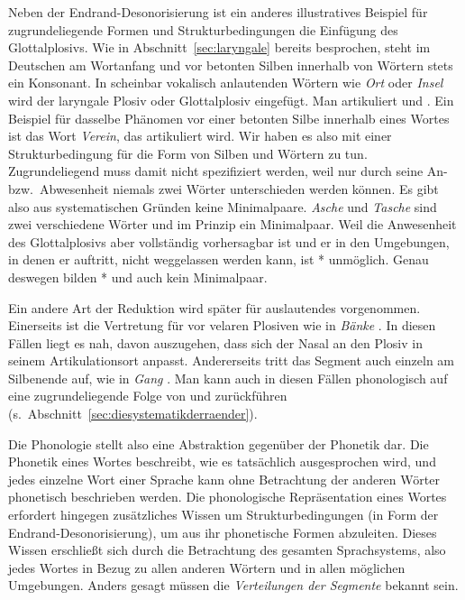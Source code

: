 Neben der Endrand-Desonorisierung ist ein anderes illustratives Beispiel für zugrundeliegende Formen und Strukturbedingungen die Einfügung des Glottalplosivs.
Wie in Abschnitt~\ref{sec:laryngale} bereits besprochen, steht im Deutschen am Wortanfang und vor betonten Silben innerhalb von Wörtern stets ein Konsonant.
In scheinbar vokalisch anlautenden Wörtern wie \textit{Ort} oder \textit{Insel} wird der laryngale Plosiv oder Glottalplosiv \textipa{[P]} eingefügt.
Man artikuliert \textipa{[P\t{O@}t]} und \textipa{[PInz@l]}.
Ein Beispiel für dasselbe Phänomen vor einer betonten Silbe innerhalb eines Wortes ist das Wort \textit{Verein}, das \textipa{[f5P\t{aE}n]} artikuliert wird.
Wir haben es also mit einer Strukturbedingung für die Form von Silben und Wörtern zu tun.
Zugrundeliegend muss \textipa{[P]} damit nicht spezifiziert werden, weil nur durch seine An- bzw.\ Abwesenheit niemals zwei Wörter unterschieden werden können.
Es gibt also aus systematischen Gründen keine Minimalpaare.
\textit{Asche} \textipa{[PaS@]} und \textit{Tasche} \textipa{[taS@]} sind zwei verschiedene Wörter und im Prinzip ein Minimalpaar.
Weil die Anwesenheit des Glottalplosivs aber vollständig vorhersagbar ist und er in den Umgebungen, in denen er auftritt, nicht weggelassen werden kann, ist *\textipa{[aS@]} unmöglich.
Genau deswegen bilden *\textipa{[aS@]} und \textipa{[PaS@]} auch kein Minimalpaar.

Ein andere Art der Reduktion wird später für auslautendes \textipa{[N]} vorgenommen.
Einerseits ist \textipa{[N]} die Vertretung für \textipa{[n]} vor velaren Plosiven wie in \textit{Bänke} \textipa{[bENk@]}.
In diesen Fällen liegt es nah, davon auszugehen, dass sich der Nasal an den Plosiv in seinem Artikulationsort anpasst.
Andererseits tritt das Segment auch einzeln am Silbenende auf, wie in \textit{Gang} \textipa{[gaN]}.
Man kann \textipa{[N]} auch in diesen Fällen phonologisch auf eine zugrundeliegende Folge von \textipa{[n]} und \textipa{[g]} zurückführen (s.\ Abschnitt~\ref{sec:diesystematikderraender}).

Die Phonologie stellt also eine Abstraktion gegenüber der Phonetik dar.
Die Phonetik eines Wortes beschreibt, wie es tatsächlich ausgesprochen wird, und jedes einzelne Wort einer Sprache kann ohne Betrachtung der anderen Wörter phonetisch beschrieben werden.
Die phonologische Repräsentation eines Wortes erfordert hingegen zusätzliches Wissen um Strukturbedingungen (\zB in Form der Endrand-Desonorisierung), um aus ihr phonetische Formen abzuleiten.
Dieses Wissen erschließt sich durch die Betrachtung des gesamten Sprachsystems, also jedes Wortes in Bezug zu allen anderen Wörtern und in allen möglichen Umgebungen.
Anders gesagt müssen die \textit{Verteilungen der Segmente} bekannt sein.

